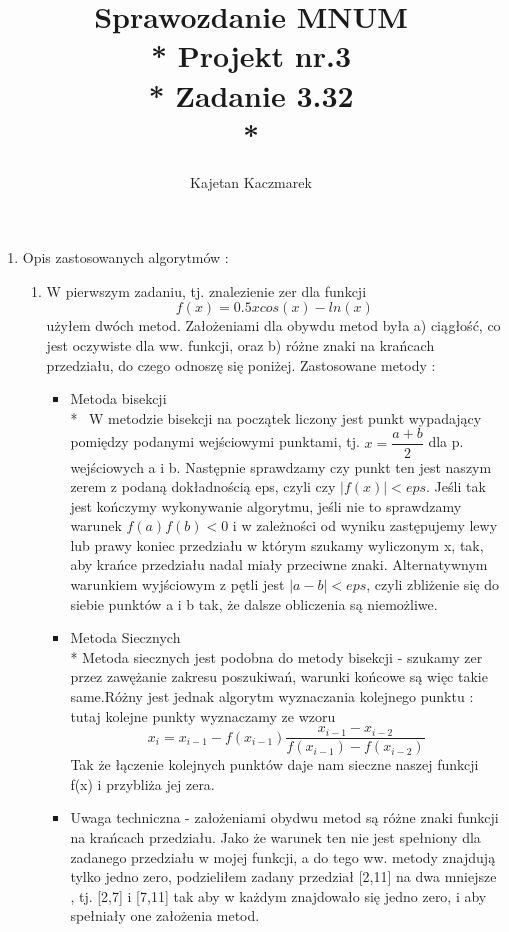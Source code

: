 \documentclass[a4paper, 11pt]{article}
\author{Kajetan Kaczmarek}
\begin{document}
\title{Sprawozdanie MNUM \\* Projekt nr.3 \\* 
Zadanie 3.32 \\*}
\maketitle

\begin{enumerate}

\item Opis zastosowanych algorytmów : 
\begin{enumerate}
\item W pierwszym zadaniu, tj. znalezienie zer dla funkcji \[f(x) = 0.5xcos(x) - ln(x) \] użyłem dwóch metod. Założeniami dla obywdu metod była a) ciągłość, co jest oczywiste dla ww. funkcji, oraz b) różne znaki na krańcach przedziału, do czego odnoszę się poniżej. Zastosowane metody : \begin{itemize} \, \item Metoda bisekcji \\* \, W metodzie bisekcji na początek liczony jest punkt wypadający pomiędzy podanymi wejściowymi punktami, tj. \( x = \dfrac{a+b}{2}\) dla p. wejściowych a i b. Następnie sprawdzamy czy punkt ten jest naszym zerem z podaną dokładnością eps, czyli czy \( |f(x)| < eps \). Jeśli tak jest kończymy wykonywanie algorytmu, jeśli nie to sprawdzamy warunek \( f(a) f(b) < 0 \) i w zależności od wyniku zastępujemy lewy lub prawy koniec przedziału w którym szukamy wyliczonym x, tak, aby krańce przedziału nadal miały przeciwne znaki. Alternatywnym warunkiem wyjściowym z pętli jest \( |a-b|<eps \), czyli zbliżenie się do siebie punktów a i b tak, że dalsze obliczenia są niemożliwe.
\item Metoda Siecznych \\* Metoda siecznych jest podobna do metody bisekcji - szukamy zer przez zawężanie zakresu poszukiwań, warunki końcowe są więc takie same.Różny jest jednak algorytm wyznaczania kolejnego punktu : tutaj kolejne punkty wyznaczamy ze wzoru \[ x_i = x_{i-1} - f(x_{i-1})\dfrac{x_{i-1} - x_{i-2}}{f(x_{i-1}) - f(x_{i-2})} \]
Tak że łączenie kolejnych punktów daje nam sieczne naszej funkcji f(x) i przybliża jej zera.
\item Uwaga techniczna - założeniami obydwu metod są różne znaki funkcji na krańcach przedziału. Jako że warunek ten nie jest spełniony dla zadanego przedziału w mojej funkcji, a do tego ww. metody znajdują tylko jedno zero, podzieliłem zadany przedział [2,11] na dwa mniejsze , tj. [2,7] i [7,11] tak aby w każdym znajdowało się jedno zero, i aby spełniały one założenia metod.

\end{itemize}
\end{enumerate}
\end{enumerate}
\end{document}
